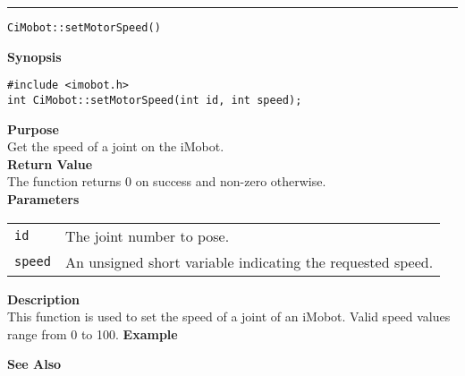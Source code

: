\noindent
\vspace{5pt}
\rule{6.5in}{0.015in}
\noindent
{\LARGE \texttt{CiMobot::setMotorSpeed()}}\\
{}

\noindent
{\bf Synopsis}\\
\begin{verbatim}
#include <imobot.h>
int CiMobot::setMotorSpeed(int id, int speed);
\end{verbatim}

\noindent
{\bf Purpose}\\
Get the speed of a joint on the iMobot.\\

\noindent
{\bf Return Value}\\
The function returns 0 on success and non-zero otherwise.\\

\noindent
{\bf Parameters}
\vspace{-0.1in}
\begin{description}
\item               
\begin{tabular}{p{10 mm}p{145 mm}}
\texttt{id} & The joint number to pose. \\
\texttt{speed} & An unsigned short variable indicating the requested speed.
\end{tabular}
\end{description}

\noindent
{\bf Description}\\
This function is used to set the speed of a joint of an iMobot. Valid speed
values range from 0 to 100.
\noindent
{\bf Example}\\
\noindent

\noindent
{\bf See Also}\\

